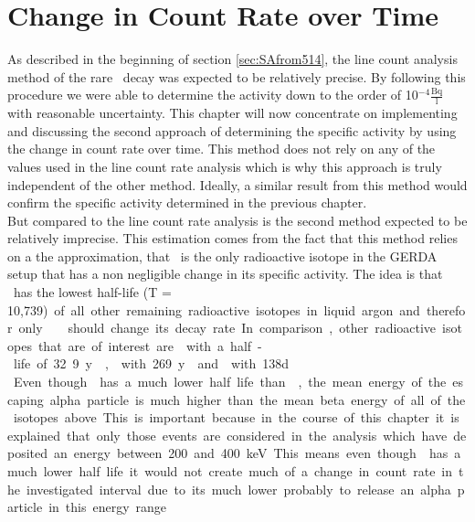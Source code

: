 \documentclass[encoding=utf8,british]{tumphthesis}
\begin{document}
\chapter{Change in Count Rate over Time}
\label{sec:SAfromDecrease}

As described in the beginning of section \ref{sec:SAfrom514}, the line count analysis method of the rare \Kr\ decay was expected to be relatively precise.
By following this procedure we were able to determine the activity down to the order of 10$^{-4} \frac{\mathrm{Bq}}{\mathrm{l}}$ with reasonable uncertainty.
This chapter will now concentrate on implementing and discussing the second approach of determining the specific activity by using the change in count rate over time.
This method does not rely on any of the values used in the line count rate analysis which is why this approach is truly independent of the other method.
Ideally, a similar result from this method would confirm the specific activity determined in the previous chapter. 
\\

But compared to the line count rate analysis is the second method  expected to be relatively imprecise.  
This estimation comes from the fact that this method relies on a the approximation, that \Kr\ is the only radioactive isotope in the GERDA setup that has a non negligible change in its specific activity.
The idea is that \Kr\ has the lowest half-life (T = 10,739\unit) of all other remaining radioactive isotopes in liquid argon and therefor only \Kr\ should change its decay rate.
In comparison, other radioactive isotopes that are of interest are  with a half-life of 32.9 y \cite{chen_nuclear_2016},  with 269 y \cite{singh_nuclear_2006} and  with 138d \cite{kondev_nuclear_2008}.
\\

Even though has a much lower half life than \Kr, the mean energy of the escaping alpha particle is much higher than the mean beta energy of all of the isotopes above.
This is important because in the course of this chapter it is explained that only those events are considered in the analysis which have deposited an energy between 200 and 400 keV. 
This means even though  has a much lower half life it would not create much of a change in count rate in the investigated interval due to its much lower probably to release an alpha particle in this energy range.
\\
\end{document}
